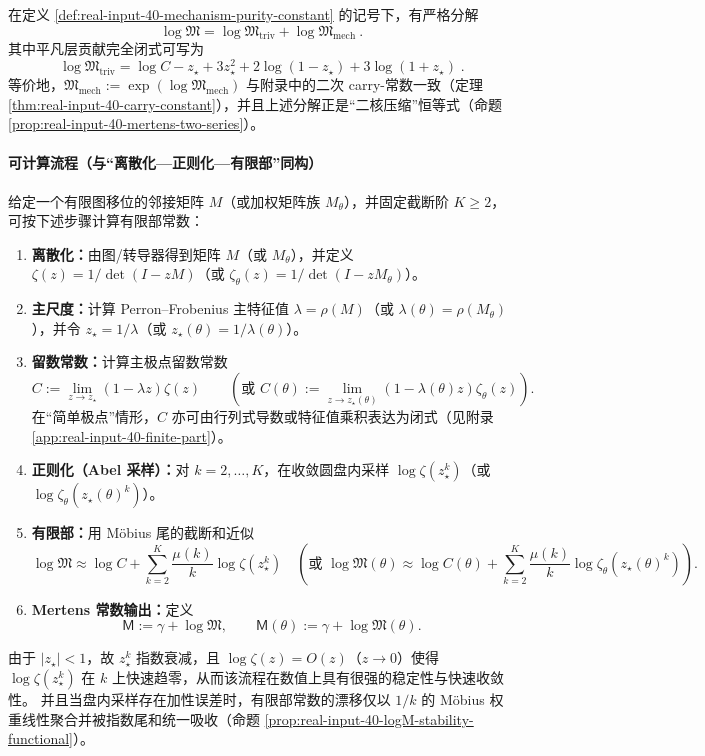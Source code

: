 \begin{proposition}[平凡层显式坍缩与二核机制常数]\label{prop:real-input-40-triv-mech-split}
在定义 \ref{def:real-input-40-mechanism-purity-constant} 的记号下，有严格分解
\[
\boxed{\ \log\mathfrak{M}=\log\mathfrak{M}_{\mathrm{triv}}+\log\mathfrak{M}_{\mathrm{mech}}\ }.
\]
其中平凡层贡献完全闭式可写为
\[
\boxed{\;
\log\mathfrak{M}_{\mathrm{triv}}
=\log C-z_\star+3z_\star^2+2\log(1-z_\star)+3\log(1+z_\star)\; }.
\]
等价地，\(\mathfrak{M}_{\mathrm{mech}}:=\exp(\log\mathfrak{M}_{\mathrm{mech}})\) 与附录中的二次 carry-常数一致（定理 \ref{thm:real-input-40-carry-constant}），并且上述分解正是“二核压缩”恒等式（命题 \ref{prop:real-input-40-mertens-two-series}）。
\end{proposition}

\paragraph{可计算流程（与“离散化—正则化—有限部”同构）}
给定一个有限图移位的邻接矩阵 $M$（或加权矩阵族 $M_\theta$），并固定截断阶 $K\ge 2$，可按下述步骤计算有限部常数：
\begin{enumerate}
  \item \textbf{离散化：}由图/转导器得到矩阵 $M$（或 $M_\theta$），并定义 $\zeta(z)=1/\det(I-zM)$（或 $\zeta_\theta(z)=1/\det(I-zM_\theta)$）。
  \item \textbf{主尺度：}计算 Perron--Frobenius 主特征值 $\lambda=\rho(M)$（或 $\lambda(\theta)=\rho(M_\theta)$），并令 $z_\star=1/\lambda$（或 $z_\star(\theta)=1/\lambda(\theta)$）。
  \item \textbf{留数常数：}计算主极点留数常数
  \[
  C:=\lim_{z\to z_\star}(1-\lambda z)\zeta(z)
  \qquad
  (\text{或 }C(\theta):=\lim_{z\to z_\star(\theta)}(1-\lambda(\theta)z)\zeta_\theta(z)).
  \]
  在“简单极点”情形，$C$ 亦可由行列式导数或特征值乘积表达为闭式（见附录 \ref{app:real-input-40-finite-part}）。
  \item \textbf{正则化（Abel 采样）：}对 $k=2,\dots,K$，在收敛圆盘内采样 $\log\zeta(z_\star^k)$（或 $\log\zeta_\theta(z_\star(\theta)^k)$）。
  \item \textbf{有限部：}用 Möbius 尾的截断和近似
  \[
  \log\mathfrak{M}\approx \log C+\sum_{k=2}^{K}\frac{\mu(k)}{k}\log\zeta(z_\star^k)
  \quad
  (\text{或 }\log\mathfrak{M}(\theta)\approx \log C(\theta)+\sum_{k=2}^{K}\frac{\mu(k)}{k}\log\zeta_\theta(z_\star(\theta)^k)).
  \]
  \item \textbf{Mertens 常数输出：}定义
  \[
  \mathsf{M}:=\gamma+\log\mathfrak{M},
  \qquad
  \mathsf{M}(\theta):=\gamma+\log\mathfrak{M}(\theta).
  \]
\end{enumerate}
由于 $|z_\star|<1$，故 $z_\star^k$ 指数衰减，且 $\log\zeta(z)=O(z)$（$z\to 0$）使得 $\log\zeta(z_\star^k)$ 在 $k$ 上快速趋零，从而该流程在数值上具有很强的稳定性与快速收敛性。
并且当盘内采样存在加性误差时，有限部常数的漂移仅以 \(1/k\) 的 Möbius 权重线性聚合并被指数尾和统一吸收（命题 \ref{prop:real-input-40-logM-stability-functional}）。

